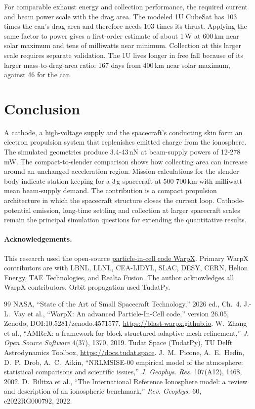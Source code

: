 \documentclass[11pt,twocolumn]{article}
\begin{document}
For comparable exhaust energy and collection performance, the required current and beam power scale with the drag area. The modeled 1U CubeSat has 103 times the can's drag area and therefore needs 103 times its thrust. Applying the same factor to power gives a first-order estimate of about 1\,W at 600\,km near solar maximum and tens of milliwatts near minimum. Collection at this larger scale requires separate validation. The 1U lives longer in free fall because of its larger mass-to-drag-area ratio: 167 days from 400\,km near solar maximum, against 46 for the can.

\section{Conclusion}
A cathode, a high-voltage supply and the spacecraft's conducting skin form an electron propulsion system that replenishes emitted charge from the ionosphere. The simulated geometries produce 3.4-43\,nN at beam-supply powers of 12-278\,mW. The compact-to-slender comparison shows how collecting area can increase around an unchanged acceleration region. Mission calculations for the slender body indicate station keeping for a 3\,g spacecraft at 500-700\,km with milliwatt mean beam-supply demand. The contribution is a compact propulsion architecture in which the spacecraft structure closes the current loop. Cathode-potential emission, long-time settling and collection at larger spacecraft scales remain the principal simulation questions for extending the quantitative results.

\paragraph{Acknowledgements.} This research used the open-source \href{https://blast-warpx.github.io}{particle-in-cell code WarpX}. Primary WarpX contributors are with LBNL, LLNL, CEA-LIDYL, SLAC, DESY, CERN, Helion Energy, TAE Technologies, and Realta Fusion. The author acknowledges all WarpX contributors. Orbit propagation used TudatPy.

\begin{thebibliography}{99}\footnotesize\setlength{\itemsep}{0pt}
 NASA, ``State of the Art of Small Spacecraft Technology,'' 2026 ed., Ch.~4.
 J.-L.~Vay et al., ``WarpX: An advanced Particle-In-Cell code,'' version 26.05, Zenodo, DOI:10.5281/zenodo.4571577, \url{https://blast-warpx.github.io}.
 W.~Zhang et al., ``AMReX: a framework for block-structured adaptive mesh refinement,'' \emph{J. Open Source Software} 4(37), 1370, 2019.
 Tudat Space (TudatPy), TU Delft Astrodynamics Toolbox, \url{https://docs.tudat.space}.
 J.~M.~Picone, A.~E.~Hedin, D.~P.~Drob, A.~C.~Aikin, ``NRLMSISE-00 empirical model of the atmosphere: statistical comparisons and scientific issues,'' \emph{J. Geophys. Res.} 107(A12), 1468, 2002.
 D.~Bilitza et al., ``The International Reference Ionosphere model: a review and description of an ionospheric benchmark,'' \emph{Rev. Geophys.} 60, e2022RG000792, 2022.
\end{thebibliography}
\end{document}
